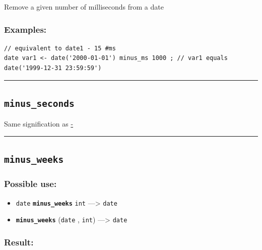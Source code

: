\documentclass[]{book}
\providecommand{\tightlist}{%
  \setlength{\itemsep}{0pt}\setlength{\parskip}{0pt}}
\theoremstyle{definition}
\theoremstyle{definition}
\theoremstyle{definition}
\theoremstyle{remark}
\begin{document}
Remove a given number of milliseconds from a date

\subsubsection{Examples:}\label{examples-247}

\begin{verbatim}
// equivalent to date1 - 15 #ms  
date var1 <- date('2000-01-01') minus_ms 1000 ; // var1 equals date('1999-12-31 23:59:59')
\end{verbatim}

\begin{center}\rule{0.5\linewidth}{\linethickness}\end{center}

\subsection{\texorpdfstring{\texttt{minus\_seconds}}{minus\_seconds}}\label{minus_seconds}

Same signification as \href{operators-a-to-a.html\#-}{-}

\begin{center}\rule{0.5\linewidth}{\linethickness}\end{center}

\subsection{\texorpdfstring{\texttt{minus\_weeks}}{minus\_weeks}}\label{minus_weeks}

\subsubsection{Possible use:}\label{possible-use-358}

\begin{itemize}
\tightlist
\item
  \texttt{date} \textbf{\texttt{minus\_weeks}} \texttt{int}
  ---\textgreater{} \texttt{date}
\item
  \textbf{\texttt{minus\_weeks}} (\texttt{date} , \texttt{int})
  ---\textgreater{} \texttt{date}
\end{itemize}

\subsubsection{Result:}\label{result-347}
\end{document}
